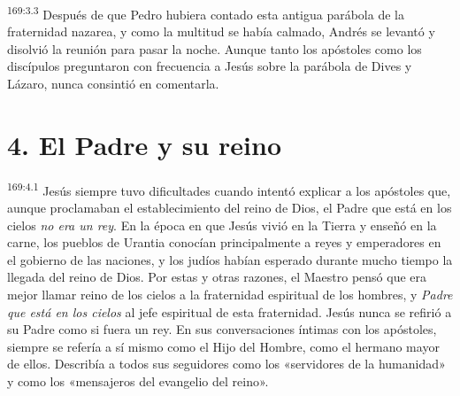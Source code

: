 \par 
\textsuperscript{169:3.3} Después de que Pedro hubiera contado esta antigua parábola de la fraternidad nazarea, y como la multitud se había calmado, Andrés se levantó y disolvió la reunión para pasar la noche. Aunque tanto los apóstoles como los discípulos preguntaron con frecuencia a Jesús sobre la parábola de Dives y Lázaro, nunca consintió en comentarla.

\section*{4. El Padre y su reino}
\par 
\textsuperscript{169:4.1} Jesús siempre tuvo dificultades cuando intentó explicar a los apóstoles que, aunque proclamaban el establecimiento del reino de Dios, el Padre que está en los cielos \textit{no era un rey}. En la época en que Jesús vivió en la Tierra y enseñó en la carne, los pueblos de Urantia conocían principalmente a reyes y emperadores en el gobierno de las naciones, y los judíos habían esperado durante mucho tiempo la llegada del reino de Dios. Por estas y otras razones, el Maestro pensó que era mejor llamar reino de los cielos a la fraternidad espiritual de los hombres, y \textit{Padre que está en los cielos} al jefe espiritual de esta fraternidad. Jesús nunca se refirió a su Padre como si fuera un rey. En sus conversaciones íntimas con los apóstoles, siempre se refería a sí mismo como el Hijo del Hombre, como el hermano mayor de ellos. Describía a todos sus seguidores como los «servidores de la humanidad» y como los «mensajeros del evangelio del reino».

